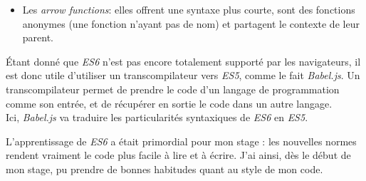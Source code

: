 \begin{itemize}
\begin{Shaded}
\begin{Highlighting}[]
 \OperatorTok{\{} \OperatorTok{,} \OperatorTok{,} \OperatorTok{\}} \OperatorTok{=} \NormalTok{()}
 \OperatorTok{=} \NormalTok{()}\OperatorTok{;}
 \OperatorTok{=} \OperatorTok{;}
 \OperatorTok{=} \OperatorTok{;}
 \OperatorTok{=} \OperatorTok{;}
\end{Highlighting}
\end{Shaded}
\item
  Les \emph{arrow functions}: elles offrent une syntaxe plus courte,
  sont des fonctions anonymes (une fonction n'ayant pas de nom) et
  partagent le contexte de leur parent.

\begin{Shaded}
\begin{Highlighting}[]
 \OperatorTok{=}  \OperatorTok{\{}  
   \OperatorTok{*} 
\OperatorTok{\}}
 \OperatorTok{=} \OperatorTok{=>} \OperatorTok{*}   
\end{Highlighting}
\end{Shaded}
\end{itemize}

\bigskip

Étant donné que \emph{ES6} n'est pas encore totalement supporté par les
navigateurs, il est donc utile d'utiliser un transcompilateur vers
\emph{ES5}, comme le fait \emph{Babel.js}. Un transcompilateur permet de
prendre le code d'un langage de programmation comme son entrée, et de
récupérer en sortie le code dans un autre langage.\\
Ici, \emph{Babel.js} va traduire les particularités syntaxiques de
\emph{ES6} en \emph{ES5}.

\bigskip

L'apprentissage de \emph{ES6} a était primordial pour mon stage : les
nouvelles normes rendent vraiment le code plus facile à lire et à
écrire. J'ai ainsi, dès le début de mon stage, pu prendre de bonnes
habitudes quant au style de mon code.

